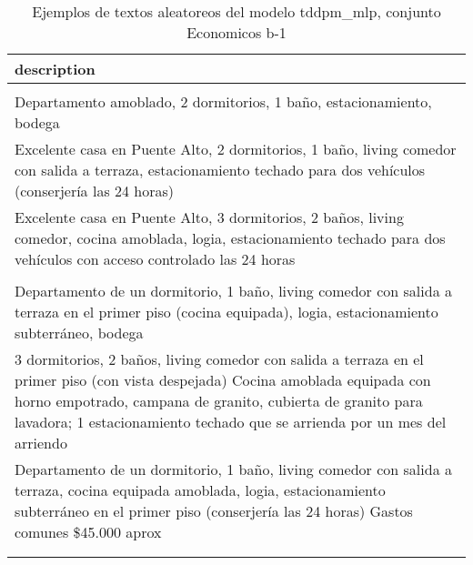 \begin{table}[H]
\centering
\fontsize{8}{14}\selectfont
\caption{Ejemplos de textos aleatoreos del modelo tddpm\_mlp, conjunto Economicos b-1}
\label{table-sample10-economicos-b-1-tddpm_mlp-text}
\begin{tabular}{|m{50em}|}
\hline
\rowcolor[gray]{0.8}
description \\
\hline  \\
\hline Departamento amoblado, 2 dormitorios, 1 baño, estacionamiento, bodega \\
\hline Excelente casa en Puente Alto, 2 dormitorios, 1 baño, living comedor con salida a terraza, estacionamiento techado para dos vehículos (conserjería las 24 horas) \\
\hline Excelente casa en Puente Alto, 3 dormitorios, 2 baños, living comedor, cocina amoblada, logia, estacionamiento techado para dos vehículos con acceso controlado las 24 horas \\
\hline  \\
\hline Departamento de un dormitorio, 1 baño, living comedor con salida a terraza en el primer piso (cocina equipada), logia, estacionamiento subterráneo, bodega \\
\hline 3 dormitorios, 2 baños, living comedor con salida a terraza en el primer piso (con vista despejada) Cocina amoblada equipada con horno empotrado, campana de granito, cubierta de granito para lavadora; 1 estacionamiento techado que se arrienda por un mes del arriendo \\
\hline Departamento de un dormitorio, 1 baño, living comedor con salida a terraza, cocina equipada amoblada, logia, estacionamiento subterráneo en el primer piso (conserjería las 24 horas) Gastos comunes \$45.000 aprox \\
\hline  \\
\hline  \\
\hline
\end{tabular}
\end{table}
